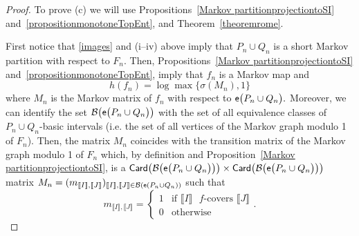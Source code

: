 \documentclass[a4paper, 11pt]{amsart}
\numberwithin{equation}{section}
\theoremstyle{customnumberedtheorem}
\theoremstyle{definitionwithbfnote}
\DeclareMathOperator{\Card}{\textsf{\upshape Card}}
\DeclareMathOperator{\eexp}{\textsf{\upshape e}}
\newcommand{\BIclass}[1]{\ensuremath{\llbracket #1\rrbracket}}
\newcommand{\emap}[1]{\ensuremath{\eexp(#1)}}
\newcommand{\bigemap}[1]{\ensuremath{\eexp\bigl(#1\bigr)}}
\def\calB{\mathcal{B}}
\newcommand{\SBI}[1][Q]{\ensuremath{\calB(#1)}}
\newcommand{\bigSBI}[1]{\ensuremath{\calB\bigl(#1\bigr)}}
\begin{document}
\begin{proof}
To prove (c) we will use
Propositions~\ref{Markov partitionprojectiontoSI}
and~\ref{propositionmonotoneTopEnt},
and Theorem~\ref{theoremrome}.

First notice that \eqref{images} and (i--iv) above imply that
$P_n \cup Q_n$ is a short Markov partition with respect to $F_n.$
Then, Propositions~\ref{Markov partitionprojectiontoSI}
and~\ref{propositionmonotoneTopEnt},
imply that $f_n$ is a Markov map and
\[
    h(f_n) = \log\max\{\sigma(M_n),1\}
\]
where $M_n$ is the Markov matrix of $f_n$ with respect to
$\bigemap{P_n \cup Q_n}.$
Moreover, we can identify the set $\bigSBI{\bigemap{P_n \cup Q_n}}$
with the set of all equivalence classes of $P_n \cup Q_n$-basic intervals
(i.e. the set of all vertices of the Markov graph modulo 1 of $F_n$).
Then, the matrix $M_n$ coincides with the
transition matrix of the Markov graph modulo 1 of $F_n$ which,
by definition and Proposition~\ref{Markov partitionprojectiontoSI},
is a
$\Card\bigl(\bigSBI{\bigemap{P_n \cup Q_n}}\bigr) \times \Card\bigl(\bigSBI{\bigemap{P_n \cup Q_n}}\bigr)$
matrix
$M_n = (m_{\BIclass{I},\BIclass{J}})_{\BIclass{I},\BIclass{J} \in \SBI[\emap{P_n \cup Q_n}]}$
such that
\[
  m_{\BIclass{I},\BIclass{J}}=\begin{cases}
      1 & \text{if $\BIclass{I}$ $f$-covers $\BIclass{J}$}\\
      0 & \text{otherwise}
\end{cases}.
\]


\end{proof}
\end{document}
